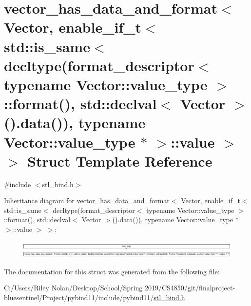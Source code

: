 \hypertarget{structvector__has__data__and__format_3_01_vector_00_01enable__if__t_3_01std_1_1is__same_3_01decl747d65b4a7fb391eecda178e3ef74ddd}{}\section{vector\+\_\+has\+\_\+data\+\_\+and\+\_\+format$<$ Vector, enable\+\_\+if\+\_\+t$<$ std\+::is\+\_\+same$<$ decltype(format\+\_\+descriptor$<$ typename Vector\+::value\+\_\+type $>$\+::format(), std\+::declval$<$ Vector $>$().data()), typename Vector\+::value\+\_\+type $\ast$ $>$\+::value $>$ $>$ Struct Template Reference}
\label{structvector__has__data__and__format_3_01_vector_00_01enable__if__t_3_01std_1_1is__same_3_01decl747d65b4a7fb391eecda178e3ef74ddd}


{\ttfamily \#include $<$stl\+\_\+bind.\+h$>$}

Inheritance diagram for vector\+\_\+has\+\_\+data\+\_\+and\+\_\+format$<$ Vector, enable\+\_\+if\+\_\+t$<$ std\+::is\+\_\+same$<$ decltype(format\+\_\+descriptor$<$ typename Vector\+::value\+\_\+type $>$\+::format(), std\+::declval$<$ Vector $>$().data()), typename Vector\+::value\+\_\+type $\ast$ $>$\+::value $>$ $>$\+:\begin{figure}[H]
\begin{center}
\leavevmode
\includegraphics[height=0.913540cm]{structvector__has__data__and__format_3_01_vector_00_01enable__if__t_3_01std_1_1is__same_3_01decl747d65b4a7fb391eecda178e3ef74ddd}
\end{center}
\end{figure}


The documentation for this struct was generated from the following file\+:\begin{DoxyCompactItemize}
\item 
C\+:/\+Users/\+Riley Nolan/\+Desktop/\+School/\+Spring 2019/\+C\+S4850/git/finalproject-\/bluesentinel/\+Project/pybind11/include/pybind11/\mbox{\hyperlink{stl__bind_8h}{stl\+\_\+bind.\+h}}\end{DoxyCompactItemize}
